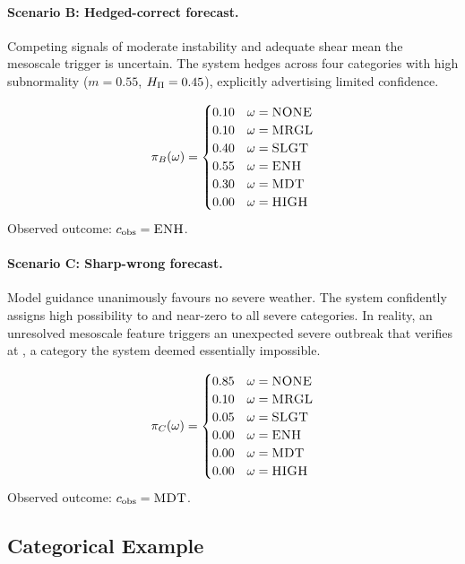 \paragraph{Scenario B: Hedged-correct  forecast.}

Competing signals of moderate instability and adequate shear mean the
mesoscale trigger is uncertain. The system hedges across four
categories with high subnormality ($m = 0.55$, $H_{\Pi} = 0.45$),
explicitly advertising limited confidence.

\[
\pi_B(\omega) = \begin{cases}
0.10 & \omega = \textsc{NONE} \\
0.10 & \omega = \textsc{MRGL} \\
0.40 & \omega = \textsc{SLGT} \\
0.55 & \omega = \textsc{ENH}  \\
0.30 & \omega = \textsc{MDT}  \\
0.00 & \omega = \textsc{HIGH}
\end{cases}
\]
Observed outcome: $c_{\mathrm{obs}} = \textsc{ENH}$.

\paragraph{Scenario C: Sharp-wrong  forecast.}

Model guidance unanimously favours no severe weather. The system
confidently assigns high possibility to  and near-zero to all
severe categories. In reality, an unresolved mesoscale feature triggers
an unexpected severe outbreak that verifies at , a category
the system deemed essentially impossible.

\[
\pi_C(\omega) = \begin{cases}
0.85 & \omega = \textsc{NONE} \\
0.10 & \omega = \textsc{MRGL} \\
0.05 & \omega = \textsc{SLGT} \\
0.00 & \omega = \textsc{ENH}  \\
0.00 & \omega = \textsc{MDT}  \\
0.00 & \omega = \textsc{HIGH}
\end{cases}
\]
Observed outcome: $c_{\mathrm{obs}} = \textsc{MDT}$.

\subsection{Categorical Example}\label{sec:categorical_walkthrough}

